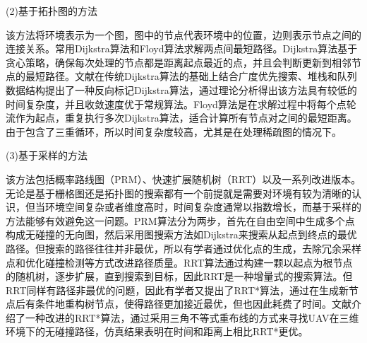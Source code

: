 (2)基于拓扑图的方法

    该方法将环境表示为一个图，图中的节点代表环境中的位置，边则表示节点之间的连接关系。常用Dijkstra\cite{dijkstraNoteTwoProblems2022}算法和Floyd算法\cite{floyd1962algorithm}求解两点间最短路径。Dijkstra算法基于贪心策略，确保每次处理的节点都是距离起点最近的点，并且会判断更新到相邻节点的最短路径。文献\cite{zhuNewAlgorithmBased2021}在传统Dijkstra算法的基础上结合广度优先搜索、堆栈和队列数据结构提出了一种反向标记Dijkstra算法，通过理论分析得出该方法具有较低的时间复杂度，并且收敛速度优于常规算法。Floyd算法是在求解过程中将每个点轮流作为起点，重复执行多次Dijkstra算法，适合计算所有节点对之间的最短距离。由于包含了三重循环，所以时间复杂度较高，尤其是在处理稀疏图的情况下。
    
(3)基于采样的方法

该方法包括概率路线图（PRM）\cite{geraertsComparativeStudyProbabilistic2004}、快速扩展随机树（RRT）\cite{lavalleRandomizedKinodynamicPlanning2001}以及一系列改进版本。无论是基于栅格图还是拓扑图的搜索都有一个前提就是需要对环境有较为清晰的认识，但当环境空间复杂或者维度高时，时间复杂度通常以指数增长，而基于采样的方法能够有效避免这一问题。PRM算法分为两步，首先在自由空间中生成多个点构成无碰撞的无向图，然后采用图搜索方法如Dijkstra来搜索从起点到终点的最优路径。但搜索的路径往往并非最优，所以有学者通过优化点的生成，去除冗余采样点和优化碰撞检测等方式改进路径质量\cite{liSmartVehiclePath2022}。RRT算法通过构建一颗以起点为根节点的随机树，逐步扩展，直到搜索到目标，因此RRT是一种增量式的搜索算法。但RRT同样有路径非最优的问题，因此有学者又提出了RRT*算法，通过在生成新节点后有条件地重构树节点，使得路径更加接近最优，但也因此耗费了时间。文献\parencite{fusicImprovedRRTAlgorithmBased2024}介绍了一种改进的RRT*算法，通过采用三角不等式重布线的方式来寻找UAV在三维环境下的无碰撞路径，仿真结果表明在时间和距离上相比RRT*更优。

